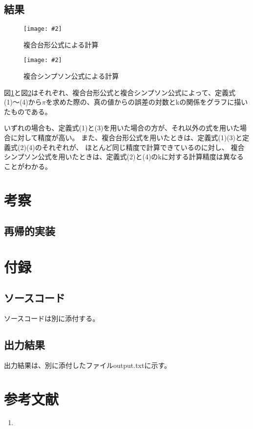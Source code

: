 \documentclass[11pt]{jsarticle}
\newcommand{\fg}[3]{ %
    \begin{figure}
        \centering
        \texttt{[image: \#2]}
        \caption{#3}
        \label{#1}
    \end{figure}
}
\newcommand{\fr}[1]{図\ref{#1}}
\begin{document}
\subsection{結果}
\fg{fig3}{graph/4_3_trapezoidal.png}{複合台形公式による計算}
\fg{fig4}{graph/4_3_simpsons.png}{複合シンプソン公式による計算}

\fr{fig3}と\fr{fig4}はそれぞれ、複合台形公式と複合シンプソン公式によって、定義式(1)〜(4)から$\pi$を求めた際の、真の値からの誤差の対数とkの関係をグラフに描いたものである。

いずれの場合も、定義式(1)と(3)を用いた場合の方が、それ以外の式を用いた場合に対して精度が高い。
また、複合台形公式を用いたときは、定義式(1)(3)と定義式(2)(4)のそれぞれが、
ほとんど同じ精度で計算できているのに対し、
複合シンプソン公式を用いたときは、定義式(2)と(4)のkに対する計算精度は異なることがわかる。

\section{考察}

\subsection{再帰的実装}

\section{付録}
\subsection{ソースコード}
ソースコードは別に添付する。

\subsection{出力結果}
出力結果は、別に添付したファイルoutput.txtに示す。

\section{参考文献}
\begin{enumerate}
\item
\end{enumerate}
\end{document}
